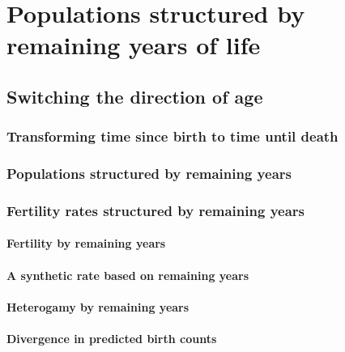 \part{Populations structured by remaining years of life}
\chapter{Switching the direction of age}
  
  
  \section{Transforming time since birth to time until death}
    
    
  \section{Populations structured by remaining years}
    
  
  \section{Fertility rates structured by remaining years}
    
    
    \subsection{Fertility by remaining years}
      
      
    \subsection{A synthetic rate based on remaining years}
      
    
    \subsection{Heterogamy by remaining years}
      
      
    \subsection{Divergence in predicted birth counts}
      
